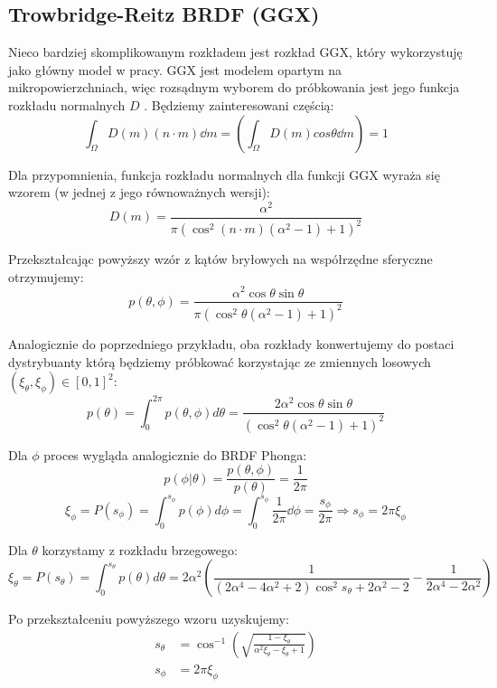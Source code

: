 \documentclass[../main.tex]{subfiles}
\begin{document}
\subsection{Trowbridge-Reitz BRDF (GGX)}

Nieco bardziej skomplikowanym rozkładem jest rozkład GGX, który wykorzystuję jako główny model w pracy. GGX jest modelem opartym na mikropowierzchniach, więc rozsądnym wyborem do próbkowania jest jego funkcja rozkładu normalnych $D$ \cite{NotesImportanceSampling}. Będziemy zainteresowani częścią:
\[
  \int_{\Omega} D(m) (n \cdot m) \dd m = \left(\int_{\Omega} D(m) cos\theta \dd m\right) = 1
\]

Dla przypomnienia, funkcja rozkładu normalnych dla funkcji GGX wyraża się wzorem (w jednej z jego równoważnych wersji):
\[
	D(m) = \frac{
		\alpha^2
	}{
    \pi \left(
      \cos^{2}(n \cdot m)(\alpha^2 - 1) + 1
    \right)^{2}
  }
\]

Przekształcając powyższy wzór z kątów bryłowych na współrzędne sferyczne otrzymujemy:
\[
  p(\theta, \phi) =
	\frac{
    \alpha^2 \cos\theta \sin\theta
	}{
    \pi \left(
      \cos^{2}\theta (\alpha^2 - 1) + 1
    \right)^{2}
  }
\]

Analogicznie do poprzedniego przykładu, oba rozkłady konwertujemy do postaci
dystrybuanty którą będziemy próbkować korzystając ze zmiennych losowych
  $(\xi_{\theta}, \xi_{\phi}) \in [0,1]^2$:
\[
  p(\theta) = \int_{0}^{2\pi} {
    p(\theta, \phi) d \theta
  } =
  \frac{2 \alpha^2 \cos\theta \sin\theta}{
    \left(
      \cos^{2}\theta (\alpha^2 - 1) + 1
    \right)^{2}
  }
\]

Dla $\phi$ proces wygląda analogicznie do BRDF Phonga:
\[
  p(\phi | \theta) = \frac{
    p(\theta, \phi)
	}{
		p(\theta)
	} = \frac{1}{2\pi}
\]
\[
	\xi_\phi = P(s_{\phi}) =
	\int_{0}^{s_{\phi}} {
		p(\phi) d\phi
	} =
	\int_{0}^{s_{\phi}} {
		\frac{1}{2\pi}
        \dd \phi
	} =
	\frac{s_{\phi}}{2\pi}
  \Rightarrow
	s_{\phi} = 2 \pi \xi_{\phi}
\]

Dla $\theta$ korzystamy z rozkładu brzegowego:
\[
  \xi_\theta = P(s_{\theta}) =
	\int_{0}^{s_{\theta}} {
		p(\theta) d\theta
	} =
  2 \alpha^2 \left(
    \frac{1}{
      (2\alpha^4 - 4\alpha^2 + 2) \cos^{2}{s_\theta} + 2\alpha^2 - 2
    } - \frac{1}{
      2\alpha^4 - 2\alpha^2
    }
  \right)
\]

Po przekształceniu powyższego wzoru uzyskujemy:
\begin{align*}
  s_\theta &= \cos^{-1}\left(
    \sqrt{
      \frac{1 - \xi_\theta}{\alpha^2 \xi_\theta - \xi_\theta + 1}
    }
  \right) \\
  s_{\phi} &= 2 \pi \xi_{\phi}
\end{align*}
\end{document}
